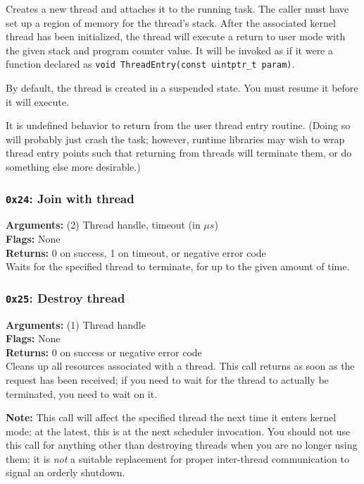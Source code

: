 \documentclass[11pt]{article}
\begin{document}
Creates a new thread and attaches it to the running task. The caller must have set up a region of memory for the thread's stack. After the associated kernel thread has been initialized, the thread will execute a return to user mode with the given stack and program counter value. It will be invoked as if it were a function declared as \texttt{void ThreadEntry(const uintptr\_t param)}.

By default, the thread is created in a suspended state. You must resume it before it will execute.

It is undefined behavior to return from the user thread entry routine. (Doing so will probably just crash the task; however, runtime libraries may wish to wrap thread entry points such that returning from threads will terminate them, or do something else more desirable.)

\subsubsection{{\tt 0x24}: Join with thread}
\textbf{Arguments:} (2) Thread handle, timeout (in $\mu s$) \\
\textbf{Flags:} None \\
\textbf{Returns:} 0 on success, 1 on timeout, or negative error code \\

Waits for the specified thread to terminate, for up to the given amount of time.

\subsubsection{{\tt 0x25}: Destroy thread}
\textbf{Arguments:} (1) Thread handle \\
\textbf{Flags:} None \\
\textbf{Returns:} 0 on success or negative error code \\

Cleans up all resources associated with a thread. This call returns as soon as the request has been received; if you need to wait for the thread to actually be terminated, you need to wait on it.

\textbf{Note:} This call will affect the specified thread the next time it enters kernel mode; at the latest, this is at the next scheduler invocation. You should not use this call for anything other than destroying threads when you are no longer using them; it is \textit{not} a suitable replacement for proper inter-thread communication to signal an orderly shutdown.
\end{document}
